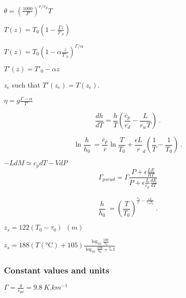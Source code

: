 \documentclass[10pt]{article}
\newcommand{\gc}{\degreeCelsius}
\begin{document}
\begin{multicols}{3}
\begin{ttdesc}[labelwidth=\widthof{\ttfamily{letterpaper/}}]
\item[Potential Temperature] $\theta = \left(\frac {1000} P
  \right)^{r/c_p} T$
\item[Adiab.\ Elevation(linear)]  $T(z)=T_0 \left( 1 - \frac {\Gamma z} {T'_0} \right)$
\item[Adiab.\ Elevation(exact)] $T(z)=T_0 \left( 1-\alpha \frac z {T'_0} \right)^{\Gamma/\alpha}$
\item[Tropospheric Lapse Rate]  $T'(z)=T'_0 - \alpha z$
\item[Equilibrium Height] $z_e$ such that $T'(z_e) = T(z_e)$.
\item[Stability Index] $\eta=g \frac {\Gamma-\alpha}{T'}$
\item[$dh/dT$ in an adiabatic ascent]
\begin{displaymath}
\frac{dh}{dT}= \frac h T \left( \frac {\overline{c}_p}{\overline{r_d}} -\frac L {r_w T} \right) \ .
\end{displaymath}
\item[Exact $h(T)$ in an adiabatic ascent]
\begin{displaymath}
\ln\frac h {h_0} \ = \frac{{\overline c}_p}{\overline{r}} \ln\frac T {T_0} 
+ \frac {\epsilon L} r_d \left( \frac 1 T - \frac 1 {T_0} \right) \ .
\end{displaymath}
\item[Pseudoadiab.\ Ascent Lapse Rate]$-L dM \simeq c_p dT - V dP \nonumber$
\begin{displaymath}
  \Gamma_{pseud} = \Gamma \frac{P+\epsilon \frac{L E}{R T}}{P+\epsilon  \frac{L}{c_p}\frac{dE}{dT}}
\end{displaymath}


\item[Approximate h(T) in an adiabatic ascent]
\begin{displaymath}
\frac h {h_0} \ = \left( \frac T {T_0} 
\right)^{\displaystyle \frac{\overline{c}_p}{\overline{r}}-\frac{\epsilon L}{r_d T_0}} \ .
\end{displaymath}

\item[Ferrel Formula] $z_s=122 (T_0-\tau_0) ~~ (\si{m}) $
\item[V\"ais\"al\"a Formula] $z_s=188 \left(T(\si{\gc}) + 105 \right) \frac{\log_{10}\frac {100}{h_0}}{\log_{10}\frac {100}{h_0}+5.1}$

\end{ttdesc}
\subsubsection{Constant values and units}
%
\begin{ttdesc}[labelwidth=\widthof{\ttfamily{letterpaper/a4paper}}]
\item[Adiabatic Lapse Rate] $\Gamma = \frac{g}{c_{pd}}=\SI{9.8}{K.km^{-1}}$
\end{ttdesc}



\end{multicols}
\end{document}
